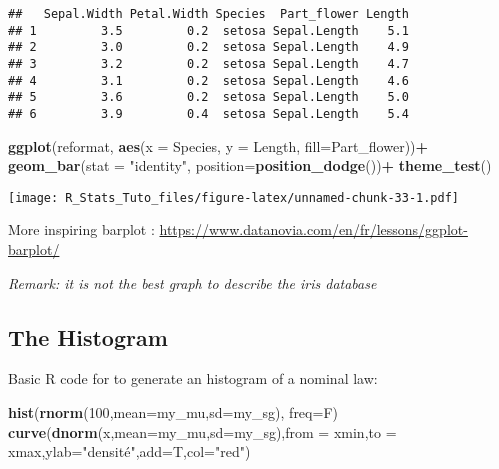 \documentclass[
]{article}
\newenvironment{Shaded}{\begin{snugshade}}{\end{snugshade}}
\newcommand{\AttributeTok}[1]{\textcolor[rgb]{0.13,0.29,0.53}{#1}}
\newcommand{\DecValTok}[1]{\textcolor[rgb]{0.00,0.00,0.81}{#1}}
\newcommand{\FunctionTok}[1]{\textcolor[rgb]{0.13,0.29,0.53}{\textbf{#1}}}
\newcommand{\NormalTok}[1]{#1}
\newcommand{\SpecialCharTok}[1]{\textcolor[rgb]{0.81,0.36,0.00}{\textbf{#1}}}
\newcommand{\StringTok}[1]{\textcolor[rgb]{0.31,0.60,0.02}{#1}}
\begin{document}
\begin{verbatim}
##   Sepal.Width Petal.Width Species  Part_flower Length
## 1         3.5         0.2  setosa Sepal.Length    5.1
## 2         3.0         0.2  setosa Sepal.Length    4.9
## 3         3.2         0.2  setosa Sepal.Length    4.7
## 4         3.1         0.2  setosa Sepal.Length    4.6
## 5         3.6         0.2  setosa Sepal.Length    5.0
## 6         3.9         0.4  setosa Sepal.Length    5.4
\end{verbatim}

\begin{Shaded}
\begin{Highlighting}[]
\FunctionTok{ggplot}\NormalTok{(reformat, }\FunctionTok{aes}\NormalTok{(}\AttributeTok{x =}\NormalTok{ Species, }\AttributeTok{y =}\NormalTok{ Length, }\AttributeTok{fill=}\NormalTok{Part\_flower))}\SpecialCharTok{+}
  \FunctionTok{geom\_bar}\NormalTok{(}\AttributeTok{stat =} \StringTok{"identity"}\NormalTok{, }\AttributeTok{position=}\FunctionTok{position\_dodge}\NormalTok{())}\SpecialCharTok{+}
  \FunctionTok{theme\_test}\NormalTok{()}
\end{Highlighting}
\end{Shaded}

\texttt{[image: R\_Stats\_Tuto\_files/figure-latex/unnamed-chunk-33-1.pdf]}

More inspiring barplot :
\url{https://www.datanovia.com/en/fr/lessons/ggplot-barplot/}

\emph{Remark: it is not the best graph to describe the iris database}

\hypertarget{the-histogram}{%
\subsection{The Histogram}\label{the-histogram}}

Basic R code for to generate an histogram of a nominal law:

\begin{Shaded}
\begin{Highlighting}[]
\FunctionTok{hist}\NormalTok{(}\FunctionTok{rnorm}\NormalTok{(}\DecValTok{100}\NormalTok{,}\AttributeTok{mean=}\NormalTok{my\_mu,}\AttributeTok{sd=}\NormalTok{my\_sg), }\AttributeTok{freq=}\NormalTok{F) }
\FunctionTok{curve}\NormalTok{(}\FunctionTok{dnorm}\NormalTok{(x,}\AttributeTok{mean=}\NormalTok{my\_mu,}\AttributeTok{sd=}\NormalTok{my\_sg),}\AttributeTok{from =}\NormalTok{ xmin,}\AttributeTok{to =}\NormalTok{ xmax,}\AttributeTok{ylab=}\StringTok{"densité"}\NormalTok{,}\AttributeTok{add=}\NormalTok{T,}\AttributeTok{col=}\StringTok{"red"}\NormalTok{)}
\end{Highlighting}
\end{Shaded}
\end{document}
